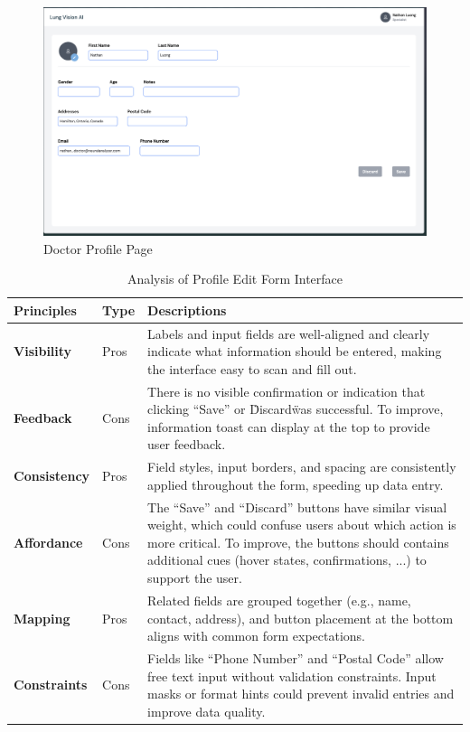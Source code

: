 \documentclass[12pt, titlepage]{article}
\begin{document}
  \begin{figure}[ht!] 
    \centering
    \includegraphics[scale=0.25]{../assets/doctor_profile.png}
    \caption{Doctor Profile Page}
    \label{fig:doctor_profile_page}
  \end{figure}

\begin{table}[h!]
    \centering
    \begin{tabular}{|p{2.5cm}|p{1.5cm}|p{11cm}|}
    \hline
    \rowcolor{gray!30}
    \textbf{Principles} & \textbf{Type} & \textbf{Descriptions} \\
    \hline
    \textbf{Visibility} & Pros & Labels and input fields are well-aligned and clearly indicate what information should be entered, making the interface easy to scan and fill out. \\
    \hline
    \textbf{Feedback} & Cons & There is no visible confirmation or indication that clicking “Save” or \"Discard\" was successful. To improve, information toast can display at the top to provide user feedback. \\
    \hline
    \textbf{Consistency} & Pros & Field styles, input borders, and spacing are consistently applied throughout the form, speeding up data entry. \\
    \hline
    \textbf{Affordance} & Cons & The “Save” and “Discard” buttons have similar visual weight, which could confuse users about which action is more critical. To improve, the buttons should contains additional cues (hover states, confirmations, ...) to support the user. \\
    \hline
    \textbf{Mapping} & Pros & Related fields are grouped together (e.g., name, contact, address), and button placement at the bottom aligns with common form expectations. \\
    \hline
    \textbf{Constraints} & Cons & Fields like “Phone Number” and “Postal Code” allow free text input without validation constraints. Input masks or format hints could prevent invalid entries and improve data quality. \\
    \hline
    \end{tabular}
    \caption{Analysis of Profile Edit Form Interface}
\end{table}
\end{document}
